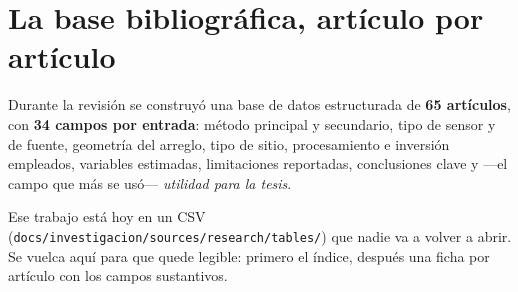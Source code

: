 \section{La base bibliogr\'afica, art\'iculo por art\'iculo}
\label{sec:base-biblio}

Durante la revisi\'on se construy\'o una base de datos estructurada
de \textbf{65 art\'iculos}, con \textbf{34 campos por entrada}: m\'etodo
principal y secundario, tipo de sensor y de fuente, geometr\'ia del arreglo, tipo
de sitio, procesamiento e inversi\'on empleados, variables estimadas,
limitaciones reportadas, conclusiones clave y ---el campo que m\'as se us\'o---
\emph{utilidad para la tesis}.

Ese trabajo est\'a hoy en un CSV
(\texttt{docs/investigacion/sources/research/tables/}) que nadie va a volver a
abrir. Se vuelca aqu\'i para que quede legible: primero el \'indice, despu\'es
una ficha por art\'iculo con los campos sustantivos.

